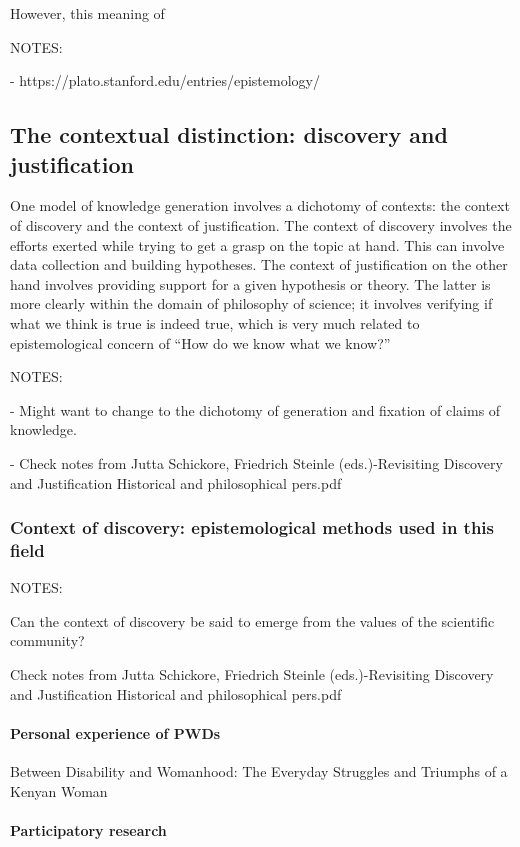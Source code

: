 \documentclass{lps}
\begin{document}
However, this meaning of 



NOTES:


- https://plato.stanford.edu/entries/epistemology/



\subsection{The contextual distinction: discovery and justification}

One model of knowledge generation involves a dichotomy of contexts: the
context of discovery and the context of justification. The context of
discovery involves the efforts exerted while trying to get a grasp on the
topic at hand. This can involve data collection and building hypotheses. The
context of justification on the other hand involves providing support for a
given hypothesis or theory. The latter is more clearly within the domain of
philosophy of science; it involves verifying if what we think is true is
indeed true, which is very much related to epistemological concern of ``How do
we know what we know?''


NOTES:

- Might want to change to the dichotomy of generation and fixation of claims of
knowledge.

- Check notes from Jutta Schickore, Friedrich Steinle (eds.)-Revisiting
Discovery and Justification Historical and philosophical pers.pdf

\subsubsection{Context of discovery: epistemological methods used in this field}

NOTES:

Can the context of discovery be said to emerge from the values of the
scientific community?

Check notes from Jutta Schickore, Friedrich Steinle (eds.)-Revisiting
Discovery and Justification Historical and philosophical pers.pdf


\paragraph{Personal experience of PWDs}

Between Disability and Womanhood: The Everyday Struggles and Triumphs of a
Kenyan Woman

\paragraph{Participatory research}
\end{document}
